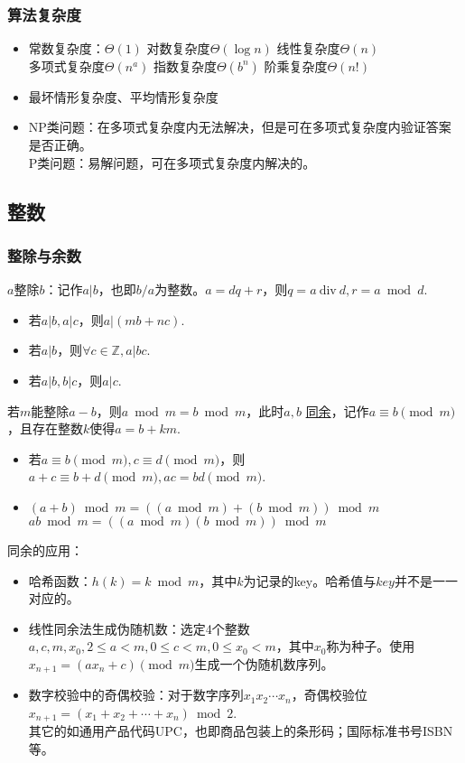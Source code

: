 \subsubsection*{算法复杂度}
\begin{itemize}
    \item 常数复杂度：$\Theta(1)$ \quad 对数复杂度$\Theta(\log n)$ \quad 线性复杂度$\Theta(n)$ \\ 多项式复杂度$\Theta(n^a)$ \quad 指数复杂度$\Theta(b^n)$ \quad 阶乘复杂度$\Theta(n!)$
    \item 最坏情形复杂度、平均情形复杂度
    \item NP类问题：在多项式复杂度内无法解决，但是可在多项式复杂度内验证答案是否正确。\\ P类问题：易解问题，可在多项式复杂度内解决的。
\end{itemize}

\subsection{整数}
\subsubsection*{整除与余数}

$a$整除$b$：记作$a | b$，也即$b / a$为整数。$a = dq + r$，则$q = a \ \mathrm{div} \ d, r = a \bmod d$.
\begin{itemize}
    \item 若$a|b, a|c$，则$a|(mb+nc)$.
    \item 若$a|b$，则$\forall c \in \mathbb{Z},a|bc$.
    \item 若$a|b,b|c$，则$a|c$.
\end{itemize}

若$m$能整除$a - b$，则$a \bmod m = b \bmod m$，此时$a,b$ \uline{同余}，记作$a \equiv b \pmod m$，且存在整数$k$使得$a = b + km$.
\begin{itemize}
    \item 若$a \equiv b \pmod m, c \equiv d \pmod m$，则$a+c \equiv b+d \pmod m, ac = bd \pmod m$.
    \item $(a + b) \bmod m = ((a \bmod m)+(b \bmod m)) \bmod m$ \\ $ab \bmod m = ((a \bmod m)(b \bmod m)) \bmod m$
\end{itemize}

同余的应用：
\begin{itemize}
    \item 哈希函数：$h(k) = k \bmod m$，其中$k$为记录的key。哈希值与$key$并不是一一对应的。
    \item 线性同余法生成伪随机数：选定4个整数$a,c,m,x_0,2 \le a < m, 0 \le c < m, 0 \le x_0 < m$，其中$x_0$称为种子。使用$x_{n+1} = (a x_n + c) \pmod m$生成一个伪随机数序列。
    \item 数字校验中的奇偶校验：对于数字序列$x_1 x_2 \cdots x_n$，奇偶校验位$x_{n+1} = (x_1 + x_2 + \cdots + x_n) \bmod 2$.\\ 其它的如通用产品代码UPC，也即商品包装上的条形码；国际标准书号ISBN等。
\end{itemize}

